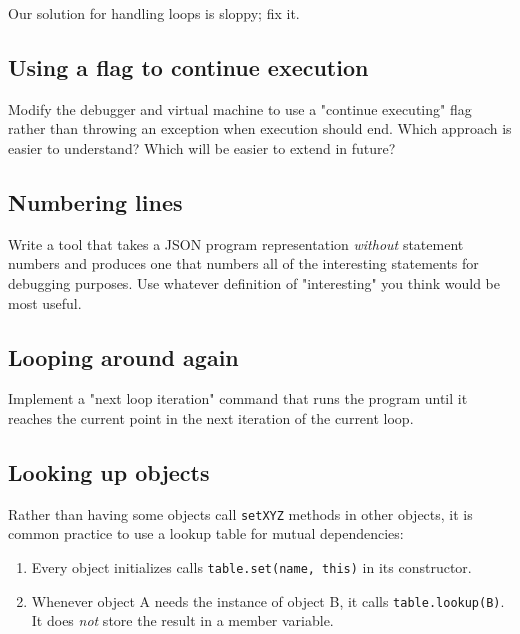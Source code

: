 \documentclass[krantzl]{krantz}
\begin{document}
Our solution for handling loops is sloppy; fix it.

\subsection*{Using a flag to continue execution}


Modify the debugger and virtual machine to use a "continue executing" flag
rather than throwing an exception when execution should end.
Which approach is easier to understand?
Which will be easier to extend in future?

\subsection*{Numbering lines}


Write a tool that takes a JSON program representation \emph{without} statement numbers
and produces one that numbers all of the interesting statements for debugging purposes.
Use whatever definition of "interesting" you think would be most useful.

\subsection*{Looping around again}


Implement a "next loop iteration" command that runs the program
until it reaches the current point in the next iteration of the current loop.

\subsection*{Looking up objects}


Rather than having some objects call \texttt{setXYZ} methods in other objects,
it is common practice to use a lookup table for mutual dependencies:

\begin{enumerate}

\item 

Every object initializes calls \texttt{table.set(name, this)} in its constructor.



\item 

Whenever object A needs the instance of object B,
    it calls \texttt{table.lookup({\textquotesingle}B{\textquotesingle})}.
    It does \emph{not} store the result in a member variable.



\end{enumerate}
\end{document}
